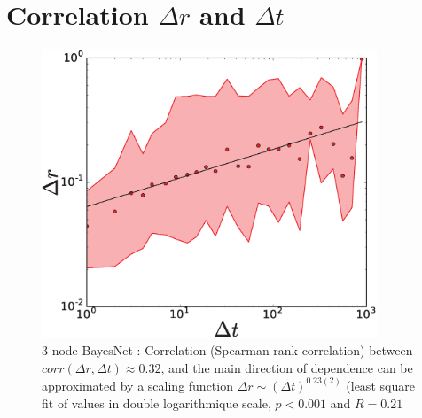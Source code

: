 \section{Correlation $\Delta r$ and $\Delta t$}
\label{si:corr_dr_dt}


\begin{figure}[h!]
\begin{center}
\includegraphics[width=10cm]{figures/cor_Delta_t_Delta_r_simple.eps}
\caption{3-node BayesNet : Correlation (Spearman rank correlation) between $corr(\Delta r,\Delta t) \approx 0.32$, and the main direction of dependence can be approximated by a scaling function $\Delta r \sim {(\Delta t)}^{0.23(2)}$ (least square fit of values in double logarithmique scale, $p < 0.001$ and $R= 0.21$}
\label{fig:corr_dr_dt}
\end{center}
\end{figure}




